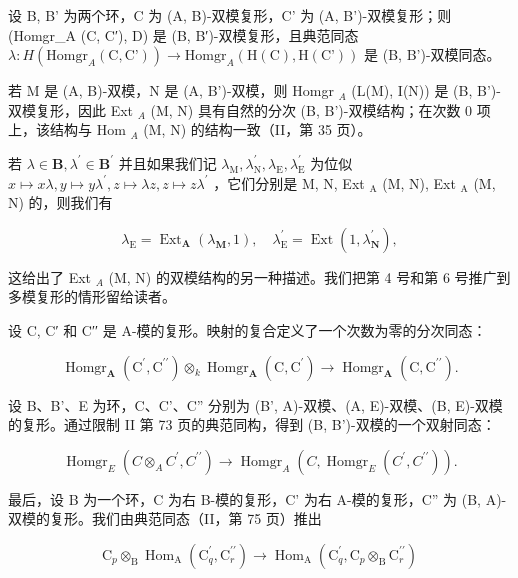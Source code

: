 设 B, B' 为两个环，C 为 (A, B)-双模复形，C' 为 (A, B')-双模复形；则 (Homgr\_A (C, C′), D) 是 (B, B′)-双模复形，且典范同态 \(\lambda: H(\text{Homgr}_A (\text{C}, \text{C'})) \to \text{Homgr}_A (\text{H}(\text{C}), \text{H}(\text{C'}))\) 是 (B, B')-双模同态。

若 M 是 (A, B)-双模，N 是 (A, B')-双模，则 Homgr \(_{A}\) (L(M), I(N)) 是 (B, B')-双模复形，因此 Ext \(_{A}\) (M, N) 具有自然的分次 (B, B')-双模结构；在次数 0 项上，该结构与 Hom \(_{A}\) (M, N) 的结构一致（II，第 35 页）。

若 \(\lambda\in\mathbf{B},\lambda^{\prime}\in\mathbf{B}^{\prime}\) 并且如果我们记 \(\lambda_{\mathrm{M}},\lambda_{\mathrm{N}}^{\prime},\lambda_{\mathrm{E}},\lambda_{\mathrm{E}}^{\prime}\) 为位似 \(x\mapsto x\lambda,y\mapsto y\lambda^{\prime},z\mapsto\lambda z,z\mapsto z\lambda^{\prime}\) ，它们分别是 M, N, Ext \(_{\mathrm{A}}\) (M, N), Ext \(_{\mathrm{A}}\) (M, N) 的，则我们有

\[
\lambda_ {\mathrm{E}} = \operatorname{Ext} _ {\mathbf {A}} \left(\lambda_ {\mathbf {M}}, 1\right), \quad \lambda_ {\mathrm{E}} ^ {\prime} = \operatorname{Ext} \left(1, \lambda_ {\mathbf {N}} ^ {\prime}\right),
\]

这给出了 Ext \(_{A}\) (M, N) 的双模结构的另一种描述。我们把第 4 号和第 6 号推广到多模复形的情形留给读者。

设 C, C′ 和 C′′ 是 A-模的复形。映射的复合定义了一个次数为零的分次同态：

\[
\operatorname{Homgr} _ {\mathbf {A}} \left(\mathrm{C} ^ {\prime}, \mathrm{C} ^ {\prime \prime}\right) \otimes_ {k} \operatorname{Homgr} _ {\mathbf {A}} \left(\mathrm{C}, \mathrm{C} ^ {\prime}\right)\rightarrow \operatorname{Homgr} _ {\mathbf {A}} \left(\mathrm{C}, \mathrm{C} ^ {\prime \prime}\right).\tag{14}
\]

设 B、B'、E 为环，C、C'、C'' 分别为 (B', A)-双模、(A, E)-双模、(B, E)-双模的复形。通过限制 II 第 73 页的典范同构，得到 (B, B')-双模的一个双射同态：

\[
\operatorname{Homgr} _ {E} \left(C \otimes_ {A} C ^ {\prime}, C ^ {\prime \prime}\right)\rightarrow \operatorname{Homgr} _ {A} \left(C, \operatorname{Homgr} _ {E} \left(C ^ {\prime}, C ^ {\prime \prime}\right)\right).\tag{15}
\]

最后，设 B 为一个环，C 为右 B-模的复形，C' 为右 A-模的复形，C'' 为 (B, A)-双模的复形。我们由典范同态（II，第 75 页）推出

\[
\mathrm{C} _ {p} \otimes_ {\mathrm{B}} \operatorname{Hom} _ {\mathrm{A}} \left(\mathrm{C} _ {q} ^ {\prime}, \mathrm{C} _ {r} ^ {\prime \prime}\right)\rightarrow \operatorname{Hom} _ {\mathrm{A}} \left(\mathrm{C} _ {q} ^ {\prime}, \mathrm{C} _ {p} \otimes_ {\mathrm{B}} \mathrm{C} _ {r} ^ {\prime \prime}\right)
\]

